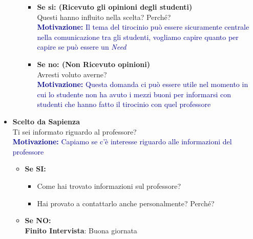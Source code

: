 \begin{itemize}
\begin{enumerate}
        \begin{itemize}
            \item \textbf{Se si: (Ricevuto gli opinioni degli studenti)}\\
            Questi hanno influito nella scelta? Perché?\\
            \textcolor{darkblue}{\textbf{Motivazione:} Il tema del tirocinio può essere sicuramente centrale nella comunicazione tra gli studenti, vogliamo capire quanto per capire se può essere un \textit{Need}}
            \item \textbf{Se no: (Non Ricevuto opinioni)}\\
            Avresti voluto averne?\\
            \textcolor{darkblue}{\textbf{Motivazione:} Questa domanda ci può essere utile nel momento in cui lo studente non ha avuto i mezzi buoni per informarsi con studenti 
            che hanno fatto il tirocinio con quel professore}
        \end{itemize}
    \end{enumerate}
    \item \textbf{Scelto da Sapienza}\\
    Ti sei informato riguardo al professore?\\
    \textcolor{darkblue}{\textbf{Motivazione:} Capiamo se c'è interesse riguardo alle informazioni del professore}
    \begin{itemize}
        \item \textbf{Se SI:}
        \begin{itemize}
            \item Come hai trovato informazioni sul professore?
            \item Hai provato a contattarlo anche personalmente? Perché?
            
        \end{itemize}

        \item \textbf{Se NO:}\\
        \textbf{Finito Intervista}: Buona giornata
    \end{itemize}

\end{itemize}


